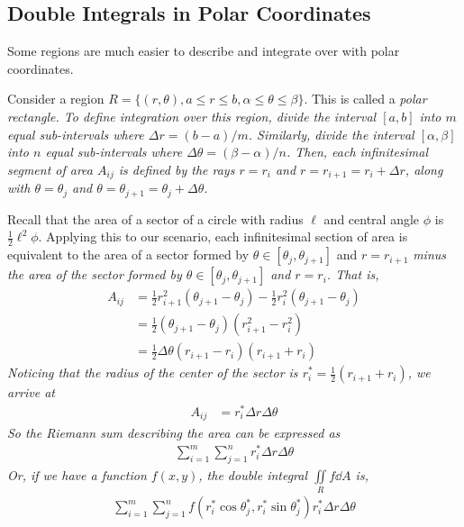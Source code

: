 \subsection{Double Integrals in Polar Coordinates}
Some regions are much easier to describe and integrate over with polar coordinates. \par 
Consider a region \( R = \{(r, \theta), a\leq r\leq b, \alpha \leq \theta \leq \beta\} \). This is called a \it{polar rectangle}. To define integration over this region, divide the interval \( [a,b] \) into \( m \) equal sub-intervals where \( \Delta r = (b-a)/m \). Similarly, divide the interval \( [\alpha, \beta] \) into \( n \) equal sub-intervals where \( \Delta \theta = (\beta - \alpha)/n \). Then, each infinitesimal segment of area \( A_{ij} \) is defined by the rays \( r = r_i \) and \( r = r_{i+1} = r_i + \Delta r \), along with \( \theta = \theta_j \) and \( \theta = \theta_{j+1} = \theta_j + \Delta \theta \).\par
Recall that the area of a sector of a circle with radius \( \ell \) and central angle \( \phi \) is \( \frac{1}{2}\ell^2\phi \). Applying this to our scenario, each infinitesimal section of area is equivalent to the area of a sector formed by \( \theta \in [\theta_j, \theta_{j+1}] \) and \( r = r_{i+1} \) \it{minus} the area of the sector formed by \( \theta\in[\theta_j, \theta_{j+1}] \) and \( r = r_i \). That is,
\begin{align*}
    A_{ij} &= \frac{1}{2}r_{i+1}^2(\theta_{j+1}-\theta_j) - \frac{1}{2}r_i^2(\theta_{j+1}-\theta_j) \\
    &= \frac{1}{2}(\theta_{j+1}-\theta_j)(r_{i+1}^2-r_i^2) \\
    &= \frac{1}{2}\Delta \theta (r_{i+1}-r_i)(r_{i+1}+r_i)
\end{align*}
Noticing that the radius of the center of the sector is \( r_i^* = \frac{1}{2}(r_{i+1}+r_i) \), we arrive at
\begin{align*}
    A_{ij} &= r_i^*\Delta r\Delta \theta
\end{align*}
So the Riemann sum describing the area can be expressed as
\begin{align*}
    \sum_{i=1}^m\sum_{j=1}^n r_i^*\Delta r \Delta \theta
\end{align*}
Or, if we have a function \( f(x, y) \), the double integral \( \iint\limits_Rf\dd A \) is,
\begin{align*}
    \sum_{i=1}^m\sum_{j=1}^nf(r_i^*\cos\theta_j^*, r_i^*\sin\theta_j^*) r_i^*\Delta r \Delta \theta
\end{align*}
